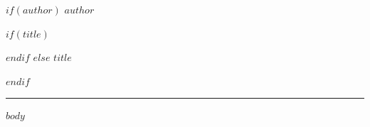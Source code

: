 \documentclass[11pt]{article}
\begin{document}
$if(author)$
{\huge\scshape $author$}\par
$if(title)$
\vspace{0.1em}{\large\itshape $title$}\par
$endif$
$else$
{\huge\scshape $title$}\par
$endif$
\vspace{0.5em}\hrule\vspace{0.9em}

$body$
\end{document}
